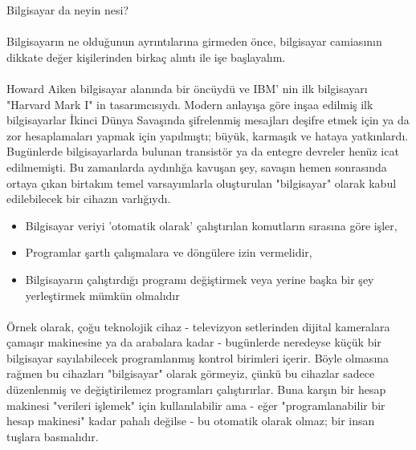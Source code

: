 \documentclass[10pt,a5paper]{book}
\begin{document}
\begin{section}{Bilgisayar da neyin nesi?}
\paragraph{}{Bilgisayarın ne olduğunun ayrıntılarına girmeden önce, bilgisayar camiasının dikkate değer kişilerinden birkaç alıntı ile işe başlayalım.}
\paragraph{}{Howard Aiken bilgisayar alanında bir öncüydü ve IBM' nin ilk bilgisayarı "Harvard Mark I" in tasarımcısıydı. Modern anlayışa göre inşaa edilmiş ilk bilgisayarlar İkinci Dünya Savaşında şifrelenmiş mesajları deşifre etmek için ya da zor hesaplamaları yapmak için yapılmıştı; büyük, karmaşık ve hataya yatkınlardı. Bugünlerde bilgisayarlarda bulunan transistör ya da entegre devreler henüz icat edilmemişti. Bu zamanlarda aydınlığa kavuşan şey, savaşın hemen sonrasında ortaya çıkan birtakım temel varsayımlarla oluşturulan "bilgisayar" olarak kabul edilebilecek bir cihazın varlığıydı.}
\begin{itemize}
 \item Bilgisayar veriyi 'otomatik olarak' çalıştırılan komutların sırasına göre işler,
 \item Programlar şartlı çalışmalara ve döngülere izin vermelidir,
 \item Bilgisayarın çalıştırdığı programı değiştirmek veya yerine başka bir şey yerleştirmek mümkün olmalıdır
 \end{itemize}
\paragraph{}{Örnek olarak, çoğu teknolojik cihaz - televizyon setlerinden dijital kameralara çamaşır makinesine ya da arabalara kadar - bugünlerde neredeyse küçük bir bilgisayar sayılabilecek programlanmış kontrol birimleri içerir. Böyle olmasına rağmen bu cihazları "bilgisayar" olarak görmeyiz, çünkü bu cihazlar sadece düzenlenmiş ve değiştirilemez programları çalıştırırlar.  Buna karşın bir hesap makinesi "verileri işlemek" için kullanılabilir ama - eğer "programlanabilir bir hesap makinesi" kadar pahalı değilse - bu otomatik olarak olmaz; bir insan tuşlara basmalıdır.}

\end{section}
\end{document}
